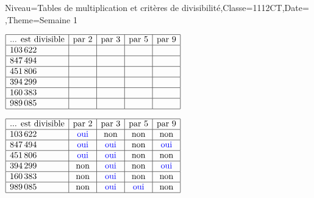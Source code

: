 \documentclass[a4paper,11pt,fleqn]{article}
\begin{document}
\begin{Maquette}[Fiche, CorrigeApres=false, CorrigeFin=true]{Niveau=Tables de multiplication et critères de divisibilité,Classe=1112CT,Date=   ,Theme=Semaine 1}
\begin{exercice}
$\begin{array}{|l|c|c|c|c|}
\hline
\text{... est divisible} & \text{par }2 & \text{par }3 & \text{par }5 & \text{par }9\\
\hline
103\,622 & & & & \\
\hline
847\,494 & & & & \\
\hline
451\,806 & & & & \\
\hline
394\,299 & & & & \\
\hline
160\,383 & & & & \\
\hline
989\,085 & & & & \\
\hline
\end{array}
$
\end{exercice}

\begin{Solution}
 $\begin{array}{|l|c|c|c|c|}
\hline
\text{... est divisible} & \text{par }2 & \text{par }3 & \text{par }5 & \text{par }9\\
\hline
103\,622 & \color{blue}{\text{oui}} & \text{non} & \text{non} & \text{non} \\\hline
847\,494 & \color{blue}{\text{oui}} & \color{blue}{\text{oui}} & \text{non} & \color{blue}{\text{oui}} \\\hline
451\,806 & \color{blue}{\text{oui}} & \color{blue}{\text{oui}} & \text{non} & \text{non} \\\hline
394\,299 & \text{non} & \color{blue}{\text{oui}} & \text{non} & \color{blue}{\text{oui}} \\\hline
160\,383 & \text{non} & \color{blue}{\text{oui}} & \text{non} & \text{non} \\\hline
989\,085 & \text{non} & \color{blue}{\text{oui}} & \color{blue}{\text{oui}} & \text{non} \\\hline
\end{array}$

\end{Solution}

\end{Maquette}
\clearpage
\end{document}
